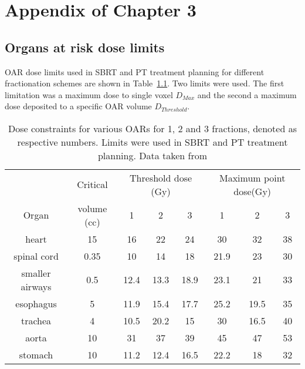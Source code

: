 % 
% 
% 

\chapter{Appendix of Chapter 3}

\section{Organs at risk dose limits}

OAR dose limits used in SBRT and PT treatment planning for different fractionation schemes are shown in Table~\ref{tab:oarlimits}. Two limits were used. The first limitation was a maximum dose to single voxel $D_{Max}$ and the second a maximum dose deposited to a 
specific OAR volume $D_{Threshold}$.

\begin{table}[H]
  \centering
  \caption{Dose constraints for various OARs for 1, 2 and 3 fractions, denoted as respective numbers. Limits were used in SBRT and PT treatment planning. Data taken from \cite{Benedict2010}}
  \begin{tabular}{|c|c|c|c|c|c|c|c|}
  \hline
   & Critical  & \multicolumn{3}{c}{Threshold dose (Gy)} & \multicolumn{3}{|c|}{Maximum point dose(Gy)}  \\
  Organ & volume (cc) & 1 & 2 & 3 & 1 & 2 & 3 \\
   \hline
   heart & 15 & 16 & 22 & 24 & 30 & 32 & 38\\
spinal cord & 0.35 & 10 & 14 & 18 & 21.9 & 23 & 30\\
smaller airways & 0.5 & 12.4 & 13.3 & 18.9 & 23.1 & 21 & 33\\
esophagus & 5 & 11.9 & 15.4 & 17.7 & 25.2 & 19.5 & 35\\
trachea & 4 & 10.5 & 20.2 & 15 & 30 & 16.5 & 40\\
aorta & 10 & 31 & 37 & 39 & 45 & 47 & 53\\
stomach & 10 & 11.2 & 12.4 & 16.5 & 22.2 & 18 & 32\\
\hline\hline
  
  \end{tabular}
  \label{tab:oarlimits}
\end{table}

